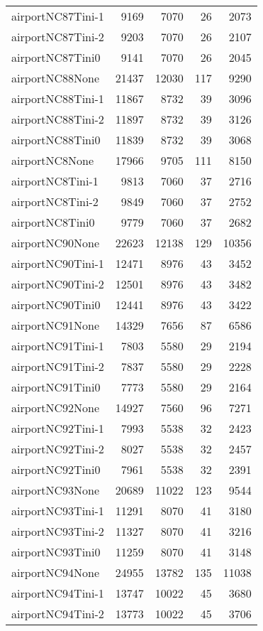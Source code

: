 \begin{longtable}{lrrrr}
airportNC87Tini-1 & 9169 & 7070 & 26 & 2073 \\
airportNC87Tini-2 & 9203 & 7070 & 26 & 2107 \\
airportNC87Tini0 & 9141 & 7070 & 26 & 2045 \\
airportNC88None & 21437 & 12030 & 117 & 9290 \\
airportNC88Tini-1 & 11867 & 8732 & 39 & 3096 \\
airportNC88Tini-2 & 11897 & 8732 & 39 & 3126 \\
airportNC88Tini0 & 11839 & 8732 & 39 & 3068 \\
airportNC8None & 17966 & 9705 & 111 & 8150 \\
airportNC8Tini-1 & 9813 & 7060 & 37 & 2716 \\
airportNC8Tini-2 & 9849 & 7060 & 37 & 2752 \\
airportNC8Tini0 & 9779 & 7060 & 37 & 2682 \\
airportNC90None & 22623 & 12138 & 129 & 10356 \\
airportNC90Tini-1 & 12471 & 8976 & 43 & 3452 \\
airportNC90Tini-2 & 12501 & 8976 & 43 & 3482 \\
airportNC90Tini0 & 12441 & 8976 & 43 & 3422 \\
airportNC91None & 14329 & 7656 & 87 & 6586 \\
airportNC91Tini-1 & 7803 & 5580 & 29 & 2194 \\
airportNC91Tini-2 & 7837 & 5580 & 29 & 2228 \\
airportNC91Tini0 & 7773 & 5580 & 29 & 2164 \\
airportNC92None & 14927 & 7560 & 96 & 7271 \\
airportNC92Tini-1 & 7993 & 5538 & 32 & 2423 \\
airportNC92Tini-2 & 8027 & 5538 & 32 & 2457 \\
airportNC92Tini0 & 7961 & 5538 & 32 & 2391 \\
airportNC93None & 20689 & 11022 & 123 & 9544 \\
airportNC93Tini-1 & 11291 & 8070 & 41 & 3180 \\
airportNC93Tini-2 & 11327 & 8070 & 41 & 3216 \\
airportNC93Tini0 & 11259 & 8070 & 41 & 3148 \\
airportNC94None & 24955 & 13782 & 135 & 11038 \\
airportNC94Tini-1 & 13747 & 10022 & 45 & 3680 \\
airportNC94Tini-2 & 13773 & 10022 & 45 & 3706 \\

\end{longtable}

